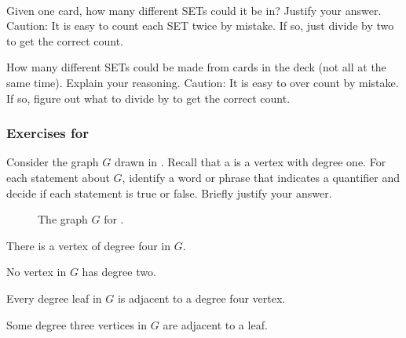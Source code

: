 \begin{exer} [\exerE] %
\label{exer_set_game_count_sets_total}
~
    \begin{exerpart}
        \item Given one card, how many different SETs could it be in?  Justify your answer.  Caution: It is easy to count each SET twice by mistake.  If so, just divide by two to get the correct count.
        \item How many different SETs could be made from cards in the deck (not all at the same time).  Explain your reasoning. Caution: It is easy to over count by mistake.  If so, figure out what to divide by to get the correct count.
    \end{exerpart}
\end{exer}


\subsubsection*{Exercises for  \subquant}

\begin{exer}[\exerP] %
\label{exer_quant_word_graphs}
    Consider the graph $G$ drawn in . Recall that a  is a vertex with degree one. For each statement about $G$, identify a word or phrase that indicates a quantifier and decide if each statement is true or false.  Briefly justify your answer.

        \begin{figure}[hbtp]
            \centering
            
            \caption{The graph $G$ for  .}
            \label{fig_elephant_quants}
        \end{figure}
        
        \begin{exerpart}
            \item There is a vertex of degree four in $G$.
            \item No vertex in $G$ has degree two.
            \item Every degree leaf in $G$ is adjacent to a degree four vertex.
            \item Some degree three vertices in $G$ are adjacent to a leaf.
        \end{exerpart}
\end{exer}

